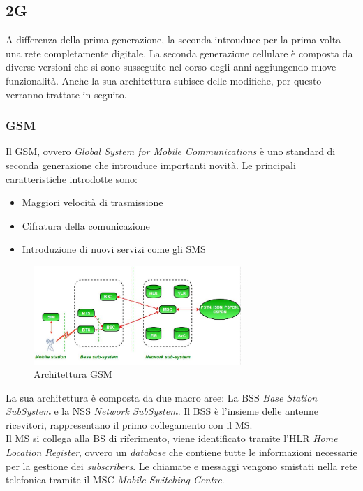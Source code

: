 \clearpage

\subsection{2G}
A differenza della prima generazione, la seconda introuduce per la prima volta una rete completamente digitale.
La seconda generazione cellulare è composta da diverse versioni che si sono susseguite nel corso degli anni aggiungendo nuove 
funzionalità.
Anche la sua architettura subisce delle modifiche, per questo verranno trattate in seguito.
\subsubsection{GSM}
Il GSM, ovvero \textit{Global System for Mobile Communications} è uno standard di seconda generazione che introuduce importanti novità.
Le principali caratteristiche introdotte sono:
\begin{itemize}
    \item Maggiori velocità di trasmissione
    \item Cifratura della comunicazione
    \item Introduzione di nuovi servizi come gli SMS
\end{itemize}
\begin{figure}[ht]
    \centering
    \includegraphics[width=0.7\textwidth]{images/2g-gsm.jpg}
    \caption{Architettura GSM}
\end{figure}
La sua architettura è composta da due macro aree: La BSS \textit{Base Station SubSystem} e la NSS \textit{Network SubSystem}.
Il BSS è l'insieme delle antenne ricevitori, rappresentano il primo collegamento con il MS.\\
Il MS si collega alla BS di riferimento, viene identificato tramite l'HLR \textit{Home Location Register}, ovvero un \textit{database} 
che contiene tutte le informazioni necessarie per la gestione dei \textit{subscribers}. Le chiamate e messaggi vengono smistati nella rete 
telefonica tramite il MSC \textit{Mobile Switching Centre}.
